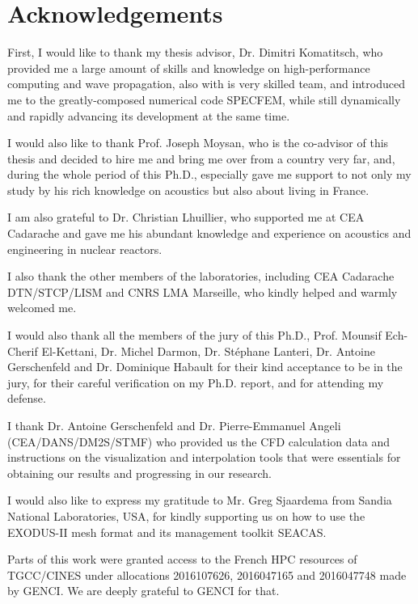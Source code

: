 \chapter*{Acknowledgements}

First, I would like to thank my thesis advisor, Dr. Dimitri Komatitsch, who provided me a large amount of skills and knowledge on high-performance computing and wave propagation,
also with is very skilled team, and introduced me to the greatly-composed numerical code SPECFEM, while still dynamically and rapidly advancing its development at the same time.

I would also like to thank Prof. Joseph Moysan, who is the co-advisor of this thesis and decided to hire me and bring me over from a country very far, and, during the whole period of this Ph.D., especially gave me support to not only my study by his rich knowledge on acoustics but also about living in France.

I am also grateful to Dr. Christian Lhuillier, who supported me at CEA Cadarache and gave me his abundant knowledge and experience on acoustics and engineering in nuclear reactors.

I also thank the other members of the laboratories, including CEA Cadarache DTN/STCP/LISM and CNRS LMA Marseille, who kindly helped and warmly welcomed me.

I would also thank all the members of the jury of this Ph.D., Prof. Mounsif Ech-Cherif El-Kettani, Dr. Michel Darmon, Dr. St\'ephane Lanteri, Dr. Antoine Gerschenfeld and Dr. Dominique Habault for their kind acceptance to be in the jury, for their careful verification on my Ph.D. report, and for attending my defense.

I thank Dr. Antoine Gerschenfeld and Dr. Pierre-Emmanuel Angeli (CEA/DANS/DM2S/STMF) who provided us the CFD calculation data and instructions on the visualization and interpolation tools that were essentials for obtaining our results and progressing in our research.

I would also like to express my gratitude to Mr. Greg Sjaardema from Sandia National Laboratories, USA, for kindly supporting us on how to use the EXODUS-II mesh format and its management toolkit SEACAS.

Parts of this work were granted access to the French HPC resources of TGCC/CINES under allocations 2016107626, 2016047165 and 2016047748 made by GENCI. We are deeply grateful to GENCI for that.
